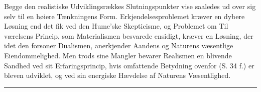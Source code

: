 \documentclass[12pt,a4paper]{book}
\newcommand{\divrule}{\begin{center}\rule{2cm}{0.4pt}\end{center}}
\newcommand{\dblrule}{\begin{center}%
  \rule{2cm}{0.4pt}\\[1.2pt]\rule{2cm}{0.4pt}\end{center}}
\begin{document}
Begge den realistiske Udviklingsrækkes Slutningspunkter
vise saaledes ud over sig selv til en høiere Tænkningens
Form. Erkjendelsesproblemet kræver en dybere Løsning end
det fik ved den Hume'ske Skepticisme, og Problemet om Til\-%
værelsens Princip, som Materialismen besvarede ensidigt, kræver
en Løsning, der idet den forsoner Dualismen, anerkjender
Aandens og Naturens væsentlige Eiendommelighed. Men trods
sine Mangler bevarer Realismen en blivende Sandhed ved sit
Erfaringsprincip, hvis omfattende Betydning ovenfor (S. 34 f.)
er bleven udviklet, og ved sin energiske Hævdelse af Naturens
Væsentlighed.

\divrule
%
\end{document}
